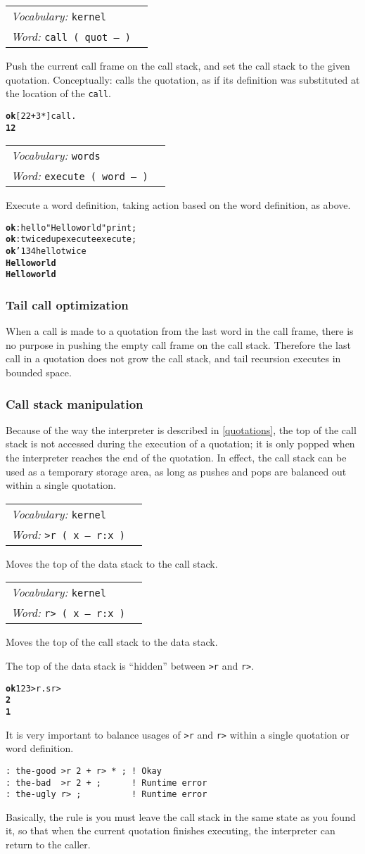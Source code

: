 \documentclass{book}
\newcommand{\bs}{\char'134}
\newcommand{\vocabulary}[1]{\emph{Vocabulary:} \texttt{#1}&\\}
\newcommand{\ordinaryword}[2]{\index{\texttt{#1}}\emph{Word:} \texttt{#2}&\\}
\newcommand{\wordtable}[1]{


\begin{tabularx}{12cm}{lX}
\hline
#1
\hline
\end{tabularx}

}
\begin{document}
\wordtable{
\vocabulary{kernel}
\ordinaryword{call}{call ( quot -- )}
}
Push the current call frame on the call stack, and set the call stack to the given quotation. Conceptually: calls the quotation, as if its definition was substituted at the location of the \texttt{call}.
\begin{alltt}
\textbf{ok} [ 2 2 + 3 * ] call .
\textbf{12}
\end{alltt}
\wordtable{
\vocabulary{words}
\ordinaryword{execute}{execute ( word -- )}
}
Execute a word definition, taking action based on the word definition, as above.
\begin{alltt}
\textbf{ok} : hello "Hello world" print ;
\textbf{ok} : twice dup execute execute ;
\textbf{ok} \bs hello twice
\textbf{Hello world}
\textbf{Hello world}
\end{alltt}

\subsubsection{Tail call optimization}

\newcommand{\tailglos}{\glossary{
name=tail call,
description=the last call in a quotation}
\glossary{
name=tail call optimization,
description=the elimination of call stack pushes when making a tail call}}

When a call is made to a quotation from the last word in the call frame, there is no
purpose in pushing the empty call frame on the call stack. Therefore the last call in a quotation does not grow the call stack, and tail recursion executes in bounded space.

\subsubsection{Call stack manipulation}

Because of the way the interpreter is described in \ref{quotations}, the top of the call stack is not accessed during the execution of a quotation; it is only popped when the interpreter reaches the end of the quotation. In effect, the call stack can be used as a temporary storage area, as long as pushes and pops are balanced out within a single quotation.
\wordtable{
\vocabulary{kernel}
\ordinaryword{>r}{>r ( x -- r:x )}
}
Moves the top of the data stack to the call stack.
\wordtable{
\vocabulary{kernel}
\ordinaryword{r>}{r> ( x -- r:x )}
}
Moves the top of the call stack to the data stack.

The top of the data stack is ``hidden'' between \texttt{>r} and \texttt{r>}.
\begin{alltt}
\textbf{ok} 1 2 3 >r .s r>
\textbf{2
1}
\end{alltt}
It is very important to balance usages of \texttt{>r} and \texttt{r>} within a single quotation or word definition.
\begin{verbatim}
: the-good >r 2 + r> * ; ! Okay
: the-bad  >r 2 + ;      ! Runtime error
: the-ugly r> ;          ! Runtime error
\end{verbatim}
Basically, the rule is you must leave the call stack in the same state as you found it, so that when the current quotation finishes executing, the interpreter can return to the caller.
\end{document}
